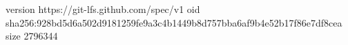 version https://git-lfs.github.com/spec/v1
oid sha256:928bd5d6a502d9181259fe9a3c4b1449b8d757bba6af9b4e52b17f86e7df8cea
size 2796344
